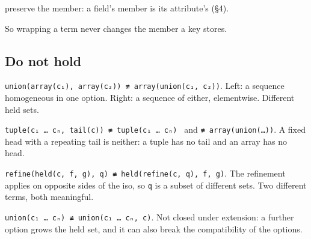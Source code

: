 \begin{theorem}
\label{eq:wrapper-member}
\leanok
preserve the member: a field's member is its attribute's (§4).
\end{theorem}

So wrapping a term never changes the member a key stores.

\subsection{Do not hold}\label{do-not-hold}

\begin{theorem}
\label{eq:union-array}
\leanok
\texttt{union(array(c₁),\ array(c₂))\ ≢\ array(union(c₁,\ c₂))}. Left: a sequence homogeneous in one
option. Right: a sequence of either, elementwise. Different held sets.
\end{theorem}

\begin{theorem}
\label{eq:tuple-tail-neither}
\leanok
\texttt{tuple(c₁\ …\ cₙ,\ tail(c))\ ≢\ tuple(c₁\ …\ cₙ)\ } and \texttt{≢\ array(union(…))}. A fixed head
with a repeating tail is neither: a tuple has no tail and an array has no head.
\end{theorem}

\begin{theorem}
\label{eq:refine-held}
\leanok
\texttt{refine(held(c,\ f,\ g),\ q)\ ≢\ held(refine(c,\ q),\ f,\ g)}. The refinement applies on opposite
sides of the iso, so \texttt{q} is a subset of different sets. Two different terms, both meaningful.
\end{theorem}

\begin{theorem}
\label{eq:union-extend}
\leanok
\texttt{union(c₁\ …\ cₙ)\ ≢\ union(c₁\ …\ cₙ,\ c)}. Not closed under extension: a further option grows the
held set, and it can also break the compatibility of the options.
\end{theorem}

